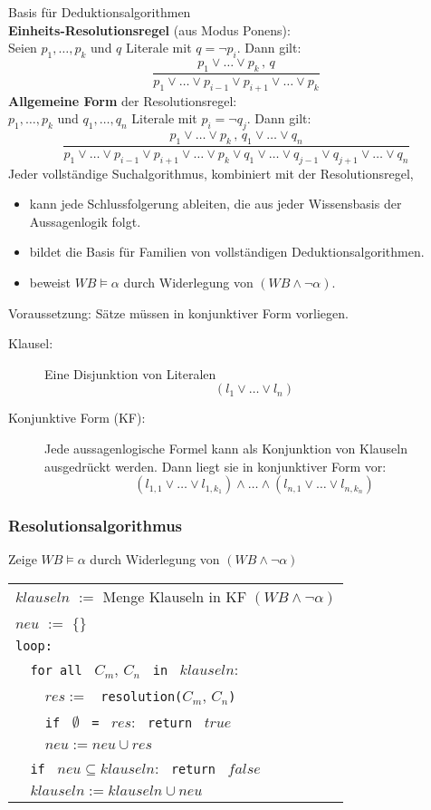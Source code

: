 Basis für Deduktionsalgorithmen \\
\textbf{Einheits-Resolutionsregel} (aus Modus Ponens): \\ Seien $p_1,\dots,p_k$ und $q$ Literale mit $q = \neg p_i$. Dann gilt: $$\frac{p_1 \vee \dots \vee p_k \, , \, q}{p_1 \vee \dots \vee p_{i-1} \vee p_{i+1} \vee \dots \vee p_k}$$
\textbf{Allgemeine Form} der Resolutionsregel: \\ $p_1,\dots,p_k$ und $q_1,\dots,q_n$ Literale mit $p_i = \neg q_j$. Dann gilt: $$\frac{p_1 \vee \dots \vee p_k \, , \, q_1 \vee \dots \vee q_n}{p_1 \vee \dots \vee p_{i-1} \vee p_{i+1} \vee \dots \vee p_k \vee q_1 \vee \dots \vee q_{j-1} \vee q_{j+1} \vee \dots \vee q_n}$$
Jeder vollständige Suchalgorithmus, kombiniert mit der Resolutionsregel,
\begin{itemize}
\item kann jede Schlussfolgerung ableiten, die aus jeder Wissensbasis der Aussagenlogik folgt.
\item bildet die Basis für Familien von vollständigen Deduktionsalgorithmen.
\item beweist $WB \models \alpha$ durch Widerlegung von $(WB \wedge \neg \alpha)$.
\end{itemize}
Voraussetzung: Sätze müssen in konjunktiver Form vorliegen.
\begin{description}
\item[Klausel:] Eine Disjunktion von Literalen $$(l_1 \vee \dots \vee l_n)$$
\item[Konjunktive Form (KF):] Jede aussagenlogische Formel kann als Konjunktion von Klauseln ausgedrückt werden. Dann liegt sie in konjunktiver Form vor: $$(l_{1,1} \vee \dots \vee l_{1,k_1}) \wedge \dots \wedge (l_{n,1} \vee \dots \vee l_{n,k_n})$$
\end{description}

\subsubsection*{Resolutionsalgorithmus}

Zeige $WB \models \alpha$ durch Widerlegung von $(WB \wedge \neg \alpha)$
\begin{center}
\begin{tabular}{l}
$klauseln$ $:=$ Menge Klauseln in KF $(WB \wedge \neg \alpha)$ \\
$neu$ $:=$ $\{\}$ \\
\verb|loop:| \\
\verb|  for all | $C_m$, $C_n$ \verb| in | $klauseln$: \\
\verb|    |$res :=$ \verb| resolution(|$C_m$, $C_n$\verb|)| \\
\verb|    if | $\emptyset$ \verb| = | $res$: \verb| return | $true$ \\
\verb|    |$neu := neu \cup res$ \\
\verb|  if | $neu \subseteq klauseln$: \verb| return | $false$ \\
\verb|  |$klauseln := klauseln \cup neu$
\end{tabular}
\end{center}

